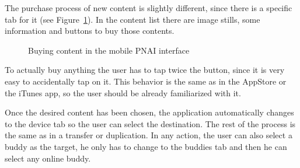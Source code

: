 The purchase process of new content is slightly different, since there is a specific tab for it (see Figure~\ref{fig:pnai-mobile-buy}).
In the content list there are image stills, some information and buttons to buy those contents.

\begin{figure}[htbp]
  \centering
  \caption{Buying content in the mobile PNAI interface}
  \label{fig:pnai-mobile-buy}
\end{figure}

To actually buy anything the user has to tap twice the button, since it is very easy to accidentally tap on it.
This behavior is the same as in the AppStore or the iTunes app, so the user should be already familiarized with it.

Once the desired content has been chosen, the application automatically changes to the device tab so the user can select the destination.
The rest of the process is the same as in a transfer or duplication.
In any action, the user can also select a buddy as the target, he only has to change to the buddies tab and then he can select any online buddy.
